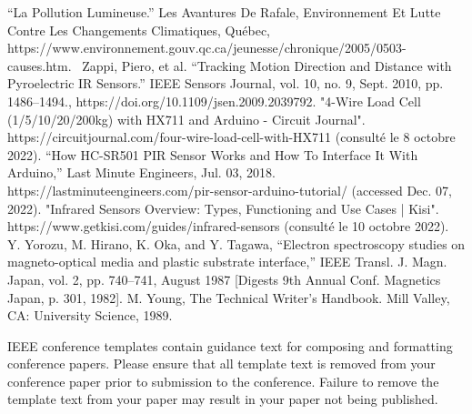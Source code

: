 \documentclass[journal]{IEEEtran}
\begin{document}
\begin{thebibliography}{00}
 “La Pollution Lumineuse.” Les Avantures De Rafale, Environnement Et Lutte Contre Les Changements Climatiques, Québec, https://www.environnement.gouv.qc.ca/jeunesse/chronique/2005/0503-causes.htm. 
 Zappi, Piero, et al. “Tracking Motion Direction and Distance with Pyroelectric IR Sensors.” IEEE Sensors Journal, vol. 10, no. 9, Sept. 2010, pp. 1486–1494., https://doi.org/10.1109/jsen.2009.2039792.
 "4-Wire Load Cell (1/5/10/20/200kg) with HX711 and Arduino - Circuit Journal". https://circuitjournal.com/four-wire-load-cell-with-HX711 (consulté le 8 octobre 2022).
 “How HC-SR501 PIR Sensor Works and How To Interface It With Arduino,” Last Minute Engineers, Jul. 03, 2018. https://lastminuteengineers.com/pir-sensor-arduino-tutorial/ (accessed Dec. 07, 2022).
 "Infrared Sensors Overview: Types, Functioning and Use Cases | Kisi". https://www.getkisi.com/guides/infrared-sensors (consulté le 10 octobre 2022).
 Y. Yorozu, M. Hirano, K. Oka, and Y. Tagawa, ``Electron spectroscopy studies on magneto-optical media and plastic substrate interface,'' IEEE Transl. J. Magn. Japan, vol. 2, pp. 740--741, August 1987 [Digests 9th Annual Conf. Magnetics Japan, p. 301, 1982].
 M. Young, The Technical Writer's Handbook. Mill Valley, CA: University Science, 1989.
\end{thebibliography}
\vspace{12pt}
\color{red}
IEEE conference templates contain guidance text for composing and formatting conference papers. Please ensure that all template text is removed from your conference paper prior to submission to the conference. Failure to remove the template text from your paper may result in your paper not being published.
\end{document}
